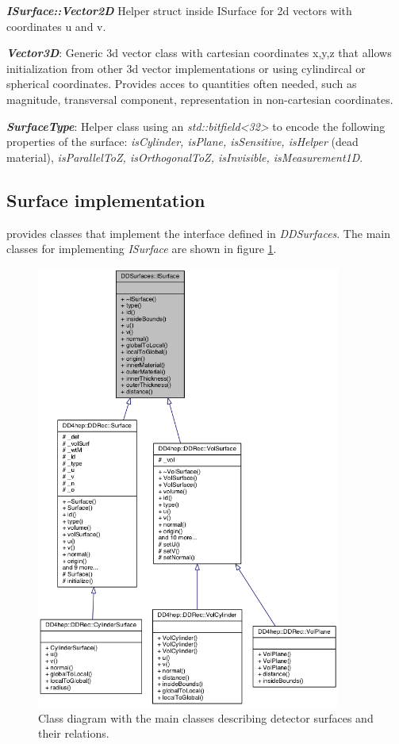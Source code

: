 \documentclass[10pt,a4paper]{article}
\begin{document}
\noindent
{\em \bf ISurface::Vector2D} Helper struct inside ISurface for 2d vectors with coordinates u and v.

\noindent
{\em \bf Vector3D}: Generic 3d vector class with cartesian coordinates x,y,z that allows initialization
from other 3d vector implementations or using cylindircal or spherical coordinates. Provides acces to
quantities often needed, such as magnitude, transversal component, representation in non-cartesian
coordinates.

\noindent
{\em \bf SurfaceType}: Helper class using an {\em std::bitfield<32>} to encode the 
following properties of the surface: {\em isCylinder, isPlane, isSensitive, isHelper} (dead material),
{\em isParallelToZ, isOrthogonalToZ, isInvisible, isMeasurement1D}.

\subsection{Surface implementation}
\label{subsec:ddrec-ddsurfaces}
\DDR provides classes that implement the interface defined in {\em DDSurfaces}.
The main classes for implementing {\em ISurface} are shown in 
figure \ref{fig:ddrec_surfaces_classes}.

\begin{figure}[h]
  \begin{center}
    \includegraphics[width=100mm] {DDRec_surface_classes.png}
    \caption{Class diagram with the main classes describing detector
      surfaces and their relations.}
    \label{fig:ddrec_surfaces_classes}
  \end{center}
\end{figure}
\end{document}
